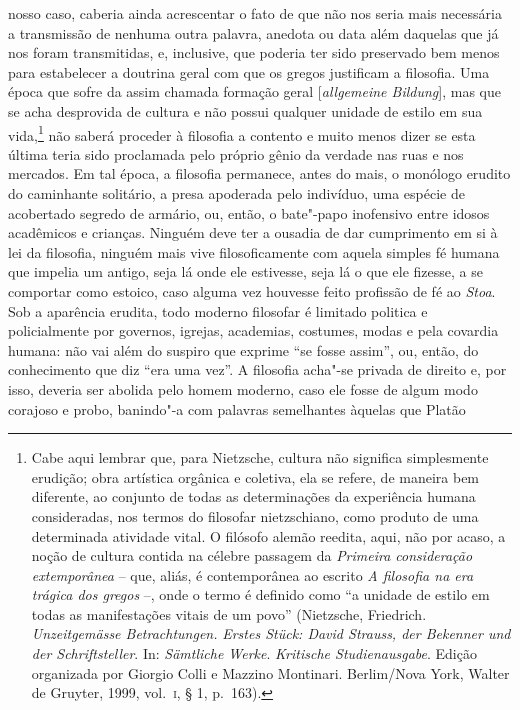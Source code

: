 nosso caso, caberia ainda acrescentar o fato de que não nos seria mais
necessária a transmissão de nenhuma outra palavra, anedota ou data além
daquelas que já nos foram transmitidas, e, inclusive, que poderia ter sido
preservado bem menos para estabelecer a doutrina geral com
que os gregos justificam a filosofia. Uma época que sofre da assim
chamada formação geral [\textit{allgemeine Bildung}], mas que se acha
desprovida de cultura e não possui qualquer unidade de estilo em sua
vida,\footnote{ Cabe aqui lembrar que, para Nietzsche, cultura não
significa simplesmente erudição; obra artística orgânica e
coletiva, ela se refere, de maneira bem diferente, ao conjunto de todas
as determinações da experiência humana consideradas, nos termos do
filosofar nietzschiano, como produto de uma determinada atividade
vital. O filósofo alemão reedita, aqui, não por acaso, a noção de
cultura contida na célebre passagem da \textit{Primeira consideração
extemporânea} -- que, aliás, é contemporânea ao escrito \textit{A filosofia na
era trágica dos gregos} --, onde o termo é definido como ``a unidade de
estilo em todas as manifestações vitais de um povo'' (Nietzsche,
Friedrich. \textit{Unzeitgemässe Betrachtungen.} \textit{Erstes Stück:
David Strauss, der Bekenner und der Schriftsteller}. In:
\textit{Sämtliche Werke}. \textit{Kritische Studienausgabe}. Edição
organizada por Giorgio Colli e Mazzino Montinari. Berlim/Nova York,
Walter de Gruyter, 1999, vol.~\textsc{i}, § 1, p.~163).} não saberá
proceder à filosofia a contento e muito menos dizer se esta última
teria sido proclamada pelo próprio gênio da verdade nas ruas e nos
mercados. Em tal época, a filosofia permanece, antes do mais, o
monólogo erudito do caminhante solitário, a presa apoderada pelo
indivíduo, uma espécie de acobertado segredo de armário, ou, então, o
bate"-papo inofensivo entre idosos acadêmicos e crianças. Ninguém deve
ter a ousadia de dar cumprimento em si à lei da filosofia, ninguém mais
vive filosoficamente com aquela simples fé humana que impelia um
antigo, seja lá onde ele estivesse, seja lá o que ele fizesse, a se
comportar como estoico, caso alguma vez houvesse feito profissão de fé
ao \textit{Stoa}. Sob a aparência erudita, todo moderno
filosofar é limitado politica e policialmente por governos, igrejas,
academias, costumes, modas e pela covardia humana: não vai além do
suspiro que exprime ``se fosse assim'', ou, então, do conhecimento que
diz ``era uma vez''. A filosofia acha"-se privada de direito e, por isso,
deveria ser abolida pelo homem moderno, caso ele fosse de algum modo
corajoso e probo, banindo"-a com palavras semelhantes àquelas que Platão
